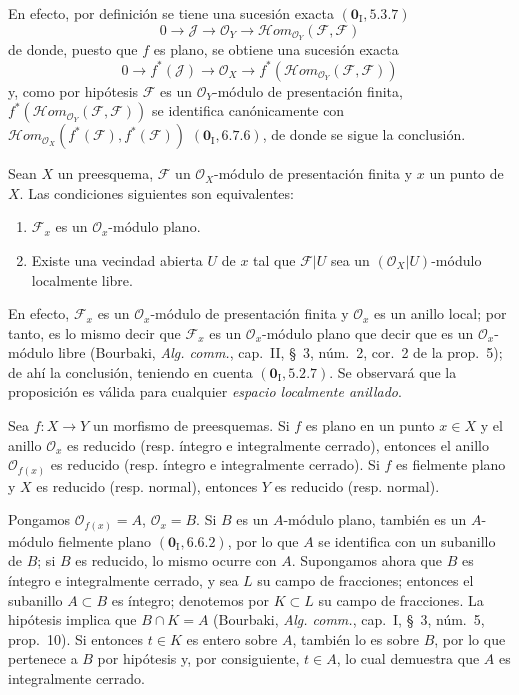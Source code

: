 En efecto, por definición se tiene una sucesión exacta $(\mathbf{0}_{\mathrm I},5.3.7)$
\[
0\to\mathscr J\to\mathcal O_Y\to
\mathscr H\!om_{\mathcal O_Y}(\mathscr F,\mathscr F)
\]
de donde, puesto que $f$ es plano, se obtiene una sucesión exacta
\[
0\to f^*(\mathscr J)\to\mathcal O_X\to
f^*(\mathscr H\!om_{\mathcal O_Y}(\mathscr F,\mathscr F))
\]
y, como por hipótesis $\mathscr F$ es un $\mathcal O_Y$-módulo de
presentación finita,
$f^*(\mathscr H\!om_{\mathcal O_Y}(\mathscr F,\mathscr F))$ se identifica
canónicamente con
$\mathscr H\!om_{\mathcal O_X}(f^*(\mathscr F),f^*(\mathscr F))$
$(\mathbf{0}_{\mathrm I},6.7.6)$, de donde se sigue la conclusión.

\begin{proposition}[2.1.12]
\label{IV.2.1.12-fr}
Sean $X$ un preesquema, $\mathscr F$ un $\mathcal O_X$-módulo de presentación
finita y $x$ un punto de $X$. Las condiciones siguientes son equivalentes:
\begin{enumerate}
\item[\emph{a)}] $\mathscr F_x$ es un $\mathcal O_x$-módulo plano.
\item[\emph{b)}] Existe una vecindad abierta $U$ de $x$ tal que
$\mathscr F|U$ sea un $(\mathcal O_X|U)$-módulo localmente libre.
\end{enumerate}
\end{proposition}

En efecto, $\mathscr F_x$ es un $\mathcal O_x$-módulo de presentación finita y
$\mathcal O_x$ es un anillo local; por tanto, es lo mismo decir que
$\mathscr F_x$ es un $\mathcal O_x$-módulo plano que decir que es un
$\mathcal O_x$-módulo libre (Bourbaki, \emph{Alg. comm.}, cap.~II, \S~3,
núm.~2, cor.~2 de la prop.~5); de ahí la conclusión, teniendo en cuenta
$(\mathbf{0}_{\mathrm I},5.2.7)$. Se observará que la proposición es válida para cualquier
\emph{espacio localmente anillado}.

\begin{proposition}[2.1.13]
\label{IV.2.1.13-fr}
Sea $f:X\to Y$ un morfismo de preesquemas. Si $f$ es plano en un punto
$x\in X$ y el anillo $\mathcal O_x$ es reducido (\textup{resp.} íntegro e integralmente
cerrado), entonces el anillo $\mathcal O_{f(x)}$
es reducido (\textup{resp.} íntegro e integralmente cerrado). Si $f$ es fielmente plano
y $X$ es reducido (\textup{resp.} normal), entonces $Y$ es reducido (\textup{resp.} normal).
\end{proposition}

Pongamos $\mathcal O_{f(x)}=A$, $\mathcal O_x=B$. Si $B$ es un $A$-módulo
plano, también es un $A$-módulo fielmente plano $(\mathbf{0}_{\mathrm I},6.6.2)$, por lo
que $A$ se identifica con un subanillo de $B$; si $B$ es reducido, lo mismo
ocurre con $A$. Supongamos ahora que $B$ es íntegro e integralmente cerrado, y
sea $L$ su campo de fracciones; entonces el subanillo $A\subset B$ es íntegro;
denotemos por $K\subset L$ su campo de fracciones. La hipótesis implica que
$B\cap K=A$ (Bourbaki, \emph{Alg. comm.}, cap.~I, \S~3, núm.~5, prop.~10).
Si entonces $t\in K$ es entero sobre $A$, también lo es sobre $B$, por lo que
pertenece a $B$ por hipótesis y, por consiguiente, $t\in A$, lo cual demuestra
que $A$ es integralmente cerrado.

